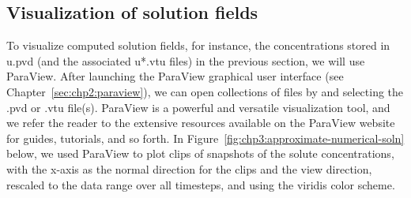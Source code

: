 \subsection{Visualization of solution fields}
To visualize computed solution fields, for instance, the
concentrations stored in u.pvd (and the associated u*.vtu files) in
the previous section, we will use ParaView. After launching the
ParaView graphical user interface (see
Chapter~\ref{sec:chp2:paraview}), we can open collections of files
by  and selecting the .pvd or .vtu
file(s). ParaView is a powerful and versatile visualization tool, and
we refer the reader to the extensive resources available on the ParaView
website~\cite{paraview:web} for guides, tutorials, and so forth. In
Figure~\ref{fig:chp3:approximate-numerical-soln} below, we used
ParaView to plot clips of snapshots of the solute
concentrations, with the x-axis as the normal direction for the clips
and the view direction, rescaled to the data range over all
  timesteps, and using the viridis color scheme.
